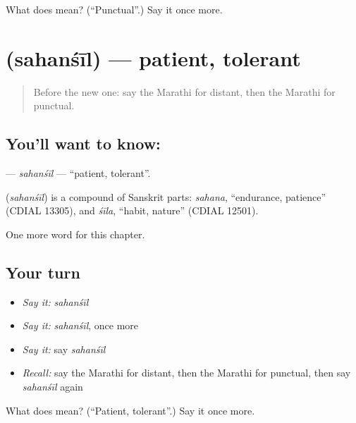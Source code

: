 \begin{tcolorbox}[breakable,colback=teal!4,colframe=teal!35!black,title={Before you move on}]
What does  mean? (\textquotedblleft{}Punctual\textquotedblright{}.) Say it once more.
\end{tcolorbox}
\section[\texorpdfstring{\mr{सहनशील} (sahanśīl)}{सहनशील (sahanśīl)}]{ (sahanśīl) — patient, tolerant}

\label{lesson:MR-C233-sahansil}



\begin{quote}
Before the new one: say the Marathi for distant, then the Marathi for punctual.
\end{quote}

\subsection*{You'll want to know: }
\textbf{} — \emph{sahanśīl} — \textquotedblleft{}patient, tolerant\textquotedblright{}.

\begin{cousinweb}
\textbf{} (\emph{sahanśīl}) is a compound of Sanskrit parts: \emph{sahana}, \textquotedblleft{}endurance, patience\textquotedblright{} (CDIAL 13305), and \emph{śīla}, \textquotedblleft{}habit, nature\textquotedblright{} (CDIAL 12501).
\end{cousinweb}

\begin{grammarlens}[title={What you've built}]
One more word for this chapter.
\end{grammarlens}

\subsection*{Your turn}
\begin{itemize}
\raggedright
  \item \emph{Say it:} \emph{sahanśīl}
  \item \emph{Say it:} \emph{sahanśīl}, once more
  \item \emph{Say it:} say \emph{sahanśīl}
  \item \emph{Recall:} say the Marathi for distant, then the Marathi for punctual, then say \emph{sahanśīl} again
\end{itemize}

\begin{tcolorbox}[breakable,colback=teal!4,colframe=teal!35!black,title={Before you move on}]
What does  mean? (\textquotedblleft{}Patient, tolerant\textquotedblright{}.) Say it once more.
\end{tcolorbox}
